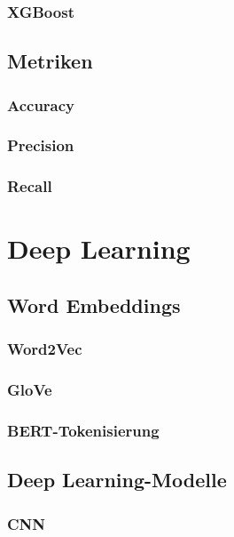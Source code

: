 \subsubsection{XGBoost}


\subsection{Metriken}

\subsubsection{Accuracy}

\subsubsection{Precision}

\subsubsection{Recall}


\section{Deep Learning}
\label{sec:deep_learning}

\subsection{Word Embeddings}
\label{sec:word_embeddings}

\subsubsection{Word2Vec}

\subsubsection{GloVe}

\subsubsection{BERT-Tokenisierung}


\subsection{Deep Learning-Modelle}
\label{sec:deep_learning_modelle}

\subsubsection{CNN}

